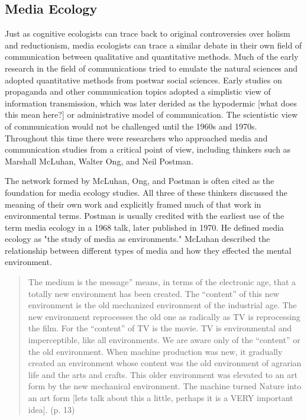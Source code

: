 \subsection{Media Ecology}

Just as cognitive ecologists can trace back to original controversies over holism and reductionism, media ecologists can trace a similar debate in their own field of communication between qualitative and quantitative methods. Much of the early research in the field of communications tried to emulate the natural sciences and adopted quantitative methods from postwar social sciences. Early studies on propaganda and other communication topics adopted a simplistic view of information transmission, which was later derided as the hypodermic [what does this mean here?] or administrative model of communication. The scientistic view of communication would not be challenged until the 1960s and 1970s. Throughout this time there were researchers who approached media and communication studies from a critical point of view, including thinkers such as Marshall McLuhan, Walter Ong, and Neil Postman.

The network formed by McLuhan, Ong, and Postman is often cited as the foundation for media ecology studies. All three of these thinkers discussed the meaning of their own work and explicitly framed much of that work in environmental terms. Postman is usually credited with the earliest use of the term media ecology in a 1968 talk, later published in 1970. He defined media ecology as "the study of media as environments." \citep{strate_media_2004} McLuhan described the relationship between different types of media and how they effected the mental environment.

\begin{quote}
The medium is the message” means, in terms of the electronic age, that a totally new environment has been created. The “content” of this new environment is the old mechanized environment of the industrial age. The new environment
reprocesses the old one as radically as TV  is reprocessing the film. For the “content” of TV is the movie. TV is environmental and imperceptible, like all environments. We are aware only of the “content” or the old environment. When machine production was new, it gradually created an environment whose content was the old environment of agrarian life and the arts and crafts. This older environment was elevated to an art form by the new mechanical environment. The machine turned Nature into an art form [lets talk about this a little, perhaps it is a VERY important idea].\citep{mcluhan_understanding_2013} (p. 13)
\end{quote}

